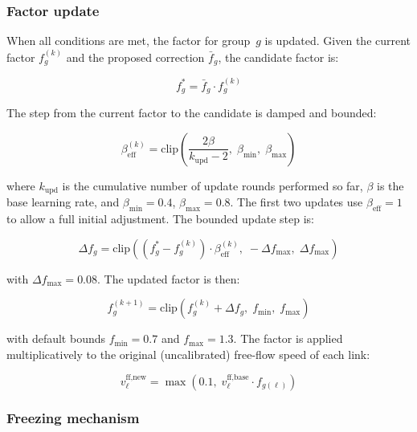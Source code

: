 \subsubsection{Factor update}

When all conditions are met, the factor for group~$g$ is updated. Given the current factor $f_g^{(k)}$ and the proposed correction $\bar{f}_g$, the candidate factor is:

\begin{equation}
    f_g^* = \bar{f}_g \cdot f_g^{(k)}
    \label{eq:candidate_factor}
\end{equation}

The step from the current factor to the candidate is damped and bounded:

\begin{equation}
    \beta_{\text{eff}}^{(k)} = \text{clip}\!\left(\frac{2\beta}{k_{\text{upd}} - 2},\; \beta_{\min},\; \beta_{\max}\right)
    \label{eq:eff_beta_fs}
\end{equation}

\noindent where $k_{\text{upd}}$ is the cumulative number of update rounds performed so far, $\beta$ is the base learning rate, and $\beta_{\min} = 0.4$, $\beta_{\max} = 0.8$. The first two updates use $\beta_{\text{eff}} = 1$ to allow a full initial adjustment. The bounded update step is:

\begin{equation}
    \Delta f_g = \text{clip}\!\left((f_g^* - f_g^{(k)}) \cdot \beta_{\text{eff}}^{(k)},\; -\Delta f_{\max},\; \Delta f_{\max}\right)
    \label{eq:step_bound}
\end{equation}

\noindent with $\Delta f_{\max} = 0.08$. The updated factor is then:

\begin{equation}
    f_g^{(k+1)} = \text{clip}\!\left(f_g^{(k)} + \Delta f_g,\; f_{\min},\; f_{\max}\right)
    \label{eq:factor_update}
\end{equation}

\noindent with default bounds $f_{\min} = 0.7$ and $f_{\max} = 1.3$. The factor is applied multiplicatively to the original (uncalibrated) free-flow speed of each link:

\begin{equation}
    v_\ell^{\text{ff,new}} = \max\!\left(0.1,\; v_\ell^{\text{ff,base}} \cdot f_{g(\ell)}\right)
    \label{eq:apply_factor}
\end{equation}

\subsubsection{Freezing mechanism}

